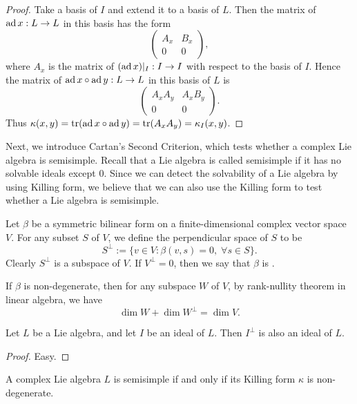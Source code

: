 \begin{proof}
    Take a basis of $I$ and extend it to a basis of $L$. Then the matrix of $\operatorname{ad} x:L\to L$ in this basis has the form
    \[
        \left(
            \begin{array}{cc}
                A_x   &   B_x  \\
                0     &   0        
            \end{array}
        \right),
    \]
    where $A_x$ is the matrix of $(\operatorname{ad} x)|_I:I\to I$ with respect to the basis of $I$. Hence the matrix of $\operatorname{ad} x\circ \operatorname{ad} y:L\to L$ in this basis of $L$ is 
    \[
        \left(
            \begin{array}{cc}
                A_x A_y   &   A_x B_y \\
                0     &   0        
            \end{array}
        \right).
    \]
    Thus $\kappa(x,y)=\operatorname{tr} (\operatorname{ad} x\circ \operatorname{ad} y)=\operatorname{tr}(A_x A_y)=\kappa_I(x,y)$.
\end{proof}

Next, we introduce Cartan's Second Criterion, which tests whether a complex Lie algebra is semisimple. Recall that a Lie algebra is called semisimple if it has no solvable ideals except 0. Since we can detect the solvability of a Lie algebra by using Killing form, we believe that we can also use the Killing form to test whether a Lie algebra is semisimple.

Let $\beta$ be a symmetric bilinear form on a finite-dimensional complex vector space $V$. For any subset $S$ of $V$, we define the perpendicular space of $S$ to be 
\[
    S^\perp := \{ v\in V : \beta(v,s)=0,\;\forall s\in S \}.
\]
Clearly $S^\perp$ is a subspace of $V$. If $V^\perp=0$, then we say that $\beta$ is . 

If $\beta$ is non-degenerate, then for any subspace $W$ of $V$, by rank-nullity theorem in linear algebra, we have 
\[
    \dim W+\dim W^\perp =\dim V.
\]

\begin{lem}
    Let $L$ be a Lie algebra, and let $I$ be an ideal of $L$. Then $I^\perp$ is also an ideal of $L$. 
\end{lem}

\begin{proof}
    Easy.
\end{proof}

\begin{thm}
    A complex Lie algebra $L$ is semisimple if and only if its Killing form $\kappa$ is non-degenerate.
\end{thm}

